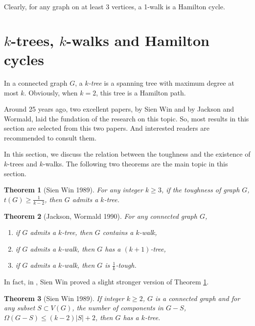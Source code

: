 \documentclass[12pt]{report}
\newtheorem{theorem}{Theorem}
\begin{document}
Clearly, for any graph on at least 3 vertices, a 1-walk is a Hamilton cycle.





\section{$k$-trees, $k$-walks and Hamilton cycles}\label{sectionktwh}


In a connected graph $G$, a {\em $k$-tree} is a spanning tree with maximum degree at most $k$. Obviously, when $k=2$, this tree is a Hamilton path.

Around 25 years ago, two excellent papers, \cite{win1989connection} by Sien Win and \cite{jackson1990k} by Jackson and Wormald, laid the fundation of the research on this topic. So, most results in this section are selected from this two papers. And interested readers are recommended to consult them.

In this section, we discuss the relation between the toughness and the existence of $k$-trees and $k$-walks. The following two theorems are the main topic in this section.
\begin{theorem}[Sien Win 1989]\label{tktree}
For any integer $k\ge3$, if the toughness of graph $G$, $t(G)\ge\frac{1}{k-2}$, then $G$ admits a $k$-tree.
\end{theorem}

\begin{theorem}[Jackson, Wormald 1990]\label{ktreetokwalk}
For any connected graph $G$,
\begin{enumerate}

\item if $G$ admits a $k$-tree, then $G$ contains a $k$-walk,

\item if $G$ admits a $k$-walk, then $G$ has a $(k+1)$-tree,

\item if $G$ admits a $k$-walk, then $G$ is $\frac{1}{k}$-tough.
\end{enumerate}
\end{theorem}


In fact, in \cite{win1989connection}, Sien Win proved a slight stronger version of Theorem \ref{tktree}.
\begin{theorem}[Sien Win 1989]\label{tktreeslistr2}
If integer $k\ge2$, $G$ is a connected graph and for any subset $S\subset V(G)$, the number of components in $G-S$, $\Omega (G-S)\le(k-2)|S|+2$, then $G$ has a $k$-tree.
\end{theorem}
\end{document}

